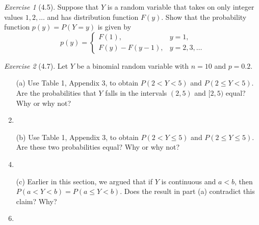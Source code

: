 \documentclass[12pt]{amsart}
\makeatletter
\theoremstyle{remark}
\newtheorem*{exercise}{Exercise}%
\renewenvironment{proof}[1][\proofname]{\par\doublespacing
  \pushQED{\qed}%
  \normalfont \topsep6\p@\@plus6\p@\relax
  \list{}{%
    \settowidth{\leftmargin}{\itshape\proofname:\hskip\labelsep}%
    \setlength{\labelwidth}{0pt}%
    \setlength{\itemindent}{-\leftmargin}%
  }%
  \item[\hskip\labelsep\itshape#1\@addpunct{:}]\ignorespaces
}{%
  \popQED\endlist\@endpefalse
  \singlespacing
}
\theoremstyle{mycomment}
\makeatother
\begin{document}
\begin{exercise}[4.5]
Suppose that $Y$ is a random variable that takes on only integer values $1, 2, \ldots$ and has distribution function $F(y)$. Show that the probability function $p(y) = P(Y = y)$ is given by
$$p(y) = \begin{cases}
F(1), & y = 1, \\
F(y) - F(y-1), & y = 2, 3, \ldots
\end{cases}$$

\begin{proof}[Solution]
 
\end{proof}
\end{exercise}

\begin{exercise}[4.7]
Let $Y$ be a binomial random variable with $n = 10$ and $p = 0.2$.

\begin{enumerate}
    \item[(a)] Use Table 1, Appendix 3, to obtain $P(2 < Y < 5)$ and $P(2 \leq Y < 5)$. Are the probabilities that $Y$ falls in the intervals $(2, 5)$ and $[2, 5)$ equal? Why or why not?
\begin{proof}[Solution]
 
\end{proof}
    \item[(b)] Use Table 1, Appendix 3, to obtain $P(2 < Y \leq 5)$ and $P(2 \leq Y \leq 5)$. Are these two probabilities equal? Why or why not?
\begin{proof}[Solution]
 
\end{proof}
    \item[(c)] Earlier in this section, we argued that if $Y$ is continuous and $a < b$, then $P(a < Y < b) = P(a \leq Y < b)$. Does the result in part (a) contradict this claim? Why?
\begin{proof}[Solution]
 
\end{proof}
\end{enumerate} 
\end{exercise}
\end{document}

